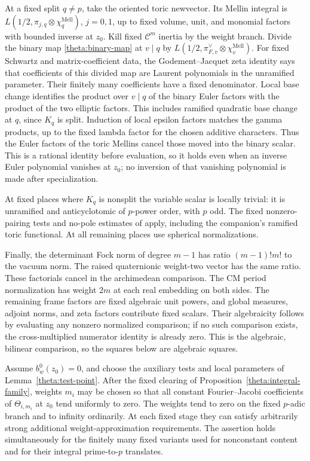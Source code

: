 At a fixed split $q\ne p$, take the oriented toric newvector.  Its
Mellin integral is
$L(1/2,\pi_{j,q}\otimes\chi_q^{\mathrm{Mell}})$, $j=0,1$,
up to fixed volume, unit, and monomial factors with bounded inverse
at $z_0$.  Kill fixed $\mathcal C^m$ inertia by the weight branch.
Divide the binary map \eqref{theta:binary-map} at $v\mid q$ by
$L(1/2,\pi_{F,v}^\vee\otimes\chi_v^{\mathrm{Mell}})$.
For fixed Schwartz and matrix-coefficient data, the
Godement--Jacquet zeta identity says that coefficients of this
divided map are Laurent polynomials in the unramified parameter.
Their finitely many coefficients have a fixed denominator.
Local base change identifies the product over $v\mid q$ of the
binary Euler factors with the product of the two elliptic factors.
This includes
ramified quadratic base change at $q$, since $K_q$ is split.
Induction of local epsilon factors matches the gamma products,
up to the fixed lambda factor for the chosen additive characters.
Thus the Euler factors of the toric Mellins cancel those moved
into the binary scalar.  This is a rational identity before
evaluation, so it holds even when an inverse Euler polynomial
vanishes at $z_0$; no inversion of that vanishing polynomial is
made after specialization.

At fixed places where $K_q$ is nonsplit the variable scalar is
locally trivial: it is unramified and anticyclotomic of $p$-power
order, with $p$ odd.  The fixed nonzero-pairing tests and no-pole
estimates of \cite[Section 5]{C} apply, including the companion's
ramified toric functional.  At all remaining places use spherical
normalizations.

Finally, the determinant Fock norm of degree $m-1$ has ratio
$(m-1)!m!$ to the vacuum norm.  The raised quaternionic weight-two
vector has the same ratio.  These factorials cancel in the
archimedean comparison.  The CM period normalization has weight
$2m$ at each real embedding on both sides.  The remaining frame
factors are fixed algebraic unit powers, and global measures,
adjoint norms, and zeta factors contribute fixed scalars.  Their
algebraicity follows by evaluating any nonzero normalized
comparison; if no such comparison exists, the cross-multiplied
numerator identity is already zero.  This is the algebraic,
bilinear comparison, so the squares below are algebraic squares.

\begin{proposition}
\label{theta:boundary-small}
Assume $b_w^0(z_0)=0$, and choose the auxiliary tests and local
parameters of Lemma~\ref{theta:test-point}.  After the fixed clearing
of Proposition~\ref{theta:integral-family}, weights $m_i$ may be
chosen so that all constant Fourier--Jacobi coefficients of
$\Theta_{i,m_i}$ at $z_0$ tend uniformly to zero.  The weights tend
to zero on the fixed $p$-adic branch and to infinity ordinarily.
At each fixed stage they can satisfy arbitrarily strong additional
weight-approximation requirements.  The assertion holds
simultaneously for the finitely many fixed variants used for
nonconstant content and for their integral prime-to-$p$ translates.
\end{proposition}

